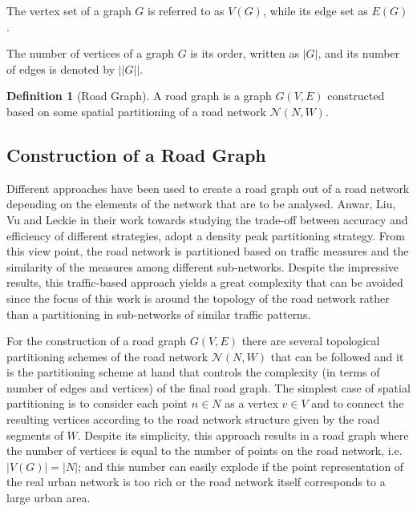 \documentclass[12pt]{article}
\theoremstyle{definition}
\newtheorem{definition}{Definition}[section]
\begin{document}
The vertex set of a graph $G$ is referred to as $V(G)$, while its edge set as $E(G)$.

The number of vertices of a graph $G$ is its order, written as $|G|$, and its number of edges is denoted by $||G||$.

\begin{definition}[Road Graph]
    A road graph is a graph $G(V,E) $ constructed based on some spatial partitioning of a road network $\mathcal{N}(N, W)$.
\end{definition}  

\subsection{Construction of a Road Graph}\label{ConstructionOfARoadGraph}
Different approaches have been used to create a road graph out of a road network depending on the elements of the network that are to be analysed. Anwar, Liu, Vu and Leckie \cite{roadNetworkDef} in their work towards studying the trade-off between accuracy and efficiency of different strategies, adopt a density peak partitioning strategy. From this view point, the road network is partitioned based on traffic measures and the similarity of the measures among different sub-networks. Despite the impressive results, this traffic-based approach yields a great complexity that can be avoided since the focus of this work is around the topology of the road network rather than a partitioning in sub-networks of similar traffic patterns. 

For the construction of a road graph $G(V,E)$ there are several topological partitioning schemes of the road network $\mathcal{N}(N,W)$ that can be followed and it is the partitioning scheme at hand that controls the complexity (in terms of number of edges and vertices) of the final road graph. The simplest case of spatial partitioning is to consider each point $n\in N$ as a vertex $v\in V$ and to connect the resulting vertices according to the road network structure given by the road segments of $W$. Despite its simplicity, this approach results in a road graph where the number of vertices is equal to the number of points on the road network, i.e. $|V(G)|=|N|$; and this number can easily explode if the point representation of the real urban network is too rich or the road network itself corresponds to a large urban area. 
\end{document}
